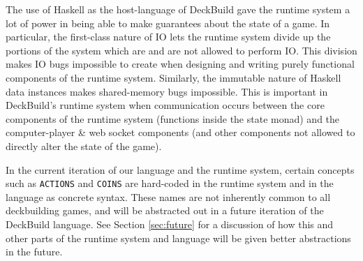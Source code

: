 The use of Haskell as the host-language of DeckBuild gave the runtime system
a lot of power in being able to make guarantees about the state of a game.
In particular, the first-class nature of IO lets the runtime system divide
up the portions of the system which are and are not allowed to perform IO.
This division makes IO bugs impossible to create when designing and writing
purely functional components of the runtime system. Similarly, the immutable
nature of Haskell data instances makes shared-memory bugs impossible. This is
important in DeckBuild's runtime system when communication occurs between the
core components of the runtime system (functions inside the state monad)
and the computer-player \& web socket components (and other components not
allowed to directly alter the state of the game).

In the current iteration of our language and the runtime system, certain
concepts such as \texttt{ACTIONS} and \texttt{COINS}
are hard-coded in the runtime system and in the language as concrete syntax.
These names are not inherently common to all deckbuilding games, and will be
abstracted out in a future iteration of the DeckBuild language. See Section
\ref{sec:future} for a discussion of how this and other parts of the runtime
system and language will be given better abstractions in the future.

